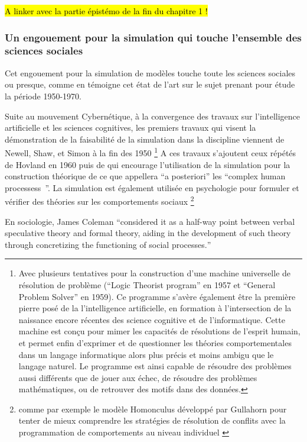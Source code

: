 \hl{A linker avec la partie épistémo de la fin du chapitre 1 ! }

\subsubsection{Un engouement pour la simulation qui touche l'ensemble des sciences sociales}

Cet engouement pour la simulation de modèles touche toute les sciences sociales ou presque, comme en témoigne cet état de l'art sur le sujet prenant pour étude la période 1950-1970.

Suite au mouvement Cybernétique, à la convergence des travaux sur l'intelligence artificielle et les sciences cognitives, les premiers travaux qui visent la démonstration de la faisabilité de la simulation dans la discipline viennent de Newell, Shaw, et Simon à la fin des 1950 \autocite{Gullahorn1965} \footnote{Avec plusieurs tentatives pour la construction d'une machine universelle de résolution de problème (\foreignquote{english}{Logic Theorist program} en 1957 et \foreignquote{english}{General Problem Solver} en 1959). Ce programme s'avère également être la première pierre posé de la l'intelligence artificielle, en formation à l'intersection de la naissance encore récentes des science cognitive et de l'informatique. Cette machine est conçu pour mimer les capacités de résolutions de l'esprit humain, et permet enfin d'exprimer et de questionner les théories comportementales dans un langage informatique alors plus précis et moins ambigu que le langage naturel. Le programme est ainsi capable de résoudre des problèmes aussi différents que de jouer aux échec, de résoudre des problèmes mathématiques,  ou de retrouver des motifs dans des données.} A ces travaux s'ajoutent ceux répétés de Hovland en 1960 puis de \textcite{Abelson1968} qui encourage l'utilisation de la simulation pour la construction théorique de ce que \textcite{Ostrom1988} appellera \foreignquote{latin}{a posteriori} les \foreignquote{english}{complex human processess }. La simulation est également utilisée en psychologie pour formuler et vérifier des théories sur les comportements sociaux \autocite{Gullahorn1965a} \footnote{ comme par exemple le modèle Homonculus développé par Gullahorn pour tenter de mieux comprendre les stratégies de résolution de conflits avec la programmation de comportements au niveau individuel \autocite{Gullahorn1965} }

En sociologie, James Coleman \foreignquote{english}[Guetzkow1972 36]{considered it as a half-way point between verbal speculative theory and formal theory, aiding in the development of such theory through concretizing the functioning of social processes.}

